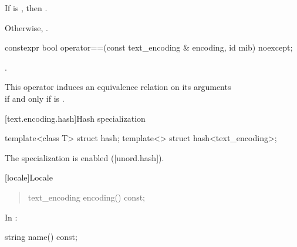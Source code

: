 \documentclass{wg21}
\begin{document}
\begin{addedblock}
\begin{itemdescr}
    If  is , then .

    Otherwise, .

\end{itemdescr}

\begin{itemdecl}
    constexpr bool operator==(const text_encoding & encoding, id mib) noexcept;
\end{itemdecl}

\begin{itemdescr}
    \returns {}.

    \remarks This operator induces an equivalence relation on its arguments\\
    if and only if  is .
\end{itemdescr}

[text.encoding.hash]{Hash specialization}

\begin{itemdecl}
template<class T> struct hash;
template<> struct hash<text_encoding>;
\end{itemdecl}

\begin{itemdescr}
The specialization is enabled ([unord.hash]).
\end{itemdescr}

\end{addedblock}


[locale]{Locale}

\begin{quote}
\begin{codeblock}
namespace std {
  class locale {
  public:
    [...]

    // locale operations
    string name() const;
\end{codeblock}
\begin{addedblock}
\begin{codeblock}
    text_encoding encoding() const;
\end{codeblock}
\end{addedblock}
\begin{codeblock}
  };
}
\end{codeblock}
\end{quote}

In :

\begin{itemdecl}
string name() const;
\end{itemdecl}
\end{document}
